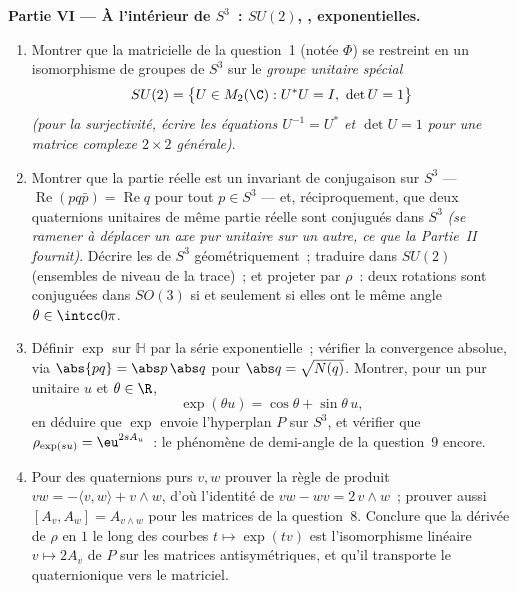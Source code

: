 \begin{problem}
\medskip
\noindent\textbf{Partie VI --- À l'intérieur de $S^3$~:
$SU(2)$, , exponentielles.}
\begin{enumerate}[resume]
  \item Montrer que la  matricielle de la
        question~1 (notée $\Phi$) se restreint en un
        isomorphisme de groupes de $S^3$ sur le \emph{groupe
        unitaire spécial}
        \[
        SU(2) = \bigl\{U \in M_2(\C) : U^*U = I,\ \det U =
        1\bigr\}
        \]
        \emph{(pour la surjectivité, écrire les équations
        $U^{-1} = U^*$ et $\det U = 1$ pour une matrice
        complexe $2\times2$ générale)}.
  \item Montrer que la partie réelle est un invariant de
        conjugaison sur $S^3$ --- $\operatorname{Re}(pq\bar
        p) = \operatorname{Re}q$ pour tout $p \in S^3$ ---
        et, réciproquement, que deux quaternions unitaires de
        même partie réelle sont conjugués dans $S^3$
        \emph{(se ramener à déplacer un axe pur unitaire sur
        un autre, ce que la Partie~II fournit)}. Décrire les
         de $S^3$ géométriquement~;
        traduire dans $SU(2)$ (ensembles de niveau de la
        trace)~; et projeter par $\rho$~: deux rotations
        sont conjuguées dans $SO(3)$ si et seulement si elles
        ont le même angle $\theta \in \intcc0\pi$.
  \item Définir $\exp$ sur $\mathbb H$ par la série
        exponentielle~; vérifier la convergence absolue, via
        $\abs{pq} = \abs p\,\abs q$ pour $\abs q =
        \sqrt{N(q)}$. Montrer, pour un pur unitaire $u$ et
        $\theta \in \R$,
        \[
        \exp(\theta u) = \cos\theta + \sin\theta\,u ,
        \]
        en déduire que $\exp$ envoie l'hyperplan $P$ sur
        $S^3$, et vérifier que $\rho_{\exp(su)} =
        \eu^{2sA_u}$~: le phénomène de demi-angle de la
        question~9 encore.
  \item Pour des quaternions purs $v, w$ prouver la règle de
        produit $vw = -\langle v, w\rangle + v\wedge w$,
        d'où l'identité de  $vw - wv =
        2\,v\wedge w$~; prouver aussi $[A_v, A_w] =
        A_{v\wedge w}$ pour les matrices de la question~8.
        Conclure que la dérivée de $\rho$ en $1$ le long des
        courbes $t \mapsto \exp(tv)$ est l'isomorphisme
        linéaire $v \mapsto 2A_v$ de $P$ sur les matrices
        antisymétriques, et qu'il transporte le 
        quaternionique vers le  matriciel.
\end{enumerate}


\end{problem}
